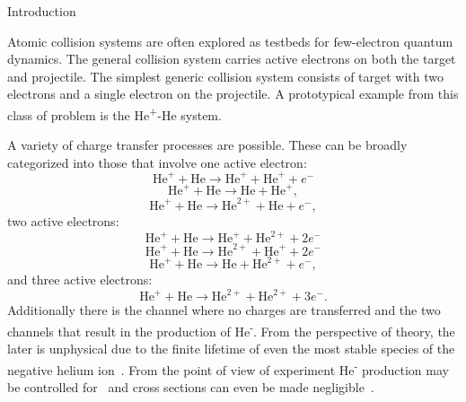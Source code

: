 \documentclass[aps, pra, reprint, groupedaddress, amsfonts,
               amsmath, amssymb, showpacs, nofootinbib]{revtex4-1}
\begin{document}
\begin{section}{Introduction \label{sec:intro}}

   Atomic collision systems are often explored as testbeds for few-electron quantum dynamics. The
   general collision system carries active electrons on both the target and projectile. The simplest
   generic collision system consists of target with two electrons and a single electron on the
   projectile. A prototypical example from this class of problem is the He\textsuperscript{+}-He system.

   A variety of charge transfer processes are possible. These can be broadly categorized into those that
   involve one active electron:
   \begin{equation} \label{eq:tpi111}
      \mathrm{He}^+ + \mathrm{He} \rightarrow \mathrm{He}^+ + \mathrm{He}^+ + e^-
   \end{equation}
   \begin{equation} \label{eq:tpi120}
      \mathrm{He}^+ + \mathrm{He} \rightarrow \mathrm{He} + \mathrm{He}^+,
   \end{equation}
   \begin{equation} \label{eq:tpi201}
      \mathrm{He}^+ + \mathrm{He} \rightarrow \mathrm{He}^{2+} + \mathrm{He} + e^-,
   \end{equation}
   two active electrons:
   \begin{equation} \label{eq:tpi012}
      \mathrm{He}^+ + \mathrm{He} \rightarrow \mathrm{He}^+ + \mathrm{He}^{2+} + 2e^-
   \end{equation}
   \begin{equation} \label{eq:tpi102}
      \mathrm{He}^+ + \mathrm{He} \rightarrow \mathrm{He}^{2+} + \mathrm{He}^+ + 2e^-
   \end{equation}
   \begin{equation} \label{eq:tpi021}
      \mathrm{He}^+ + \mathrm{He} \rightarrow \mathrm{He} + \mathrm{He}^{2+} + e^-,
   \end{equation}
   and three active electrons:
   \begin{equation} \label{eq:tpi003}
      \mathrm{He}^+ + \mathrm{He} \rightarrow \mathrm{He}^{2+} + \mathrm{He}^{2+} + 3e^{-}.
   \end{equation}
   Additionally there is the channel where no charges are transferred and the two channels that result
   in the production of He\textsuperscript{-}. From the perspective of theory, the later is unphysical
   due to the finite lifetime of even the most stable species of the negative helium
   ion~\cite{neghelife}. From the point of view of experiment He\textsuperscript{-} production
   may be controlled for~\cite{metahe} and cross sections can even be made negligible~\cite{neghe-neg}.


\end{section}
\end{document}
